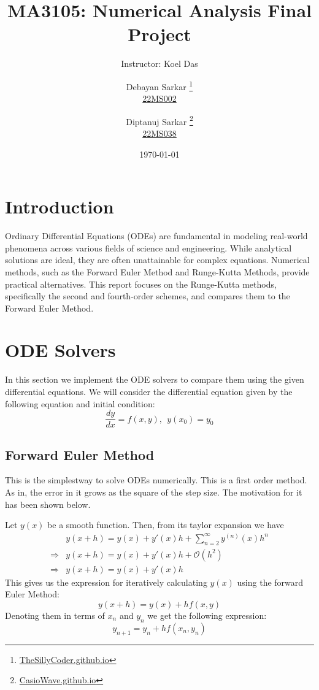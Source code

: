 \documentclass{scrartcl}
\begin{document}
    \title{MA3105: Numerical Analysis Final Project}
    \subtitle{Instructor: Koel Das}
    \author{
        Debayan Sarkar
            \thanks{{\href{https://thesillycoder.github.io}{TheSillyCoder.github.io}}}
            \\\href{mailto:ds22ms002@iiserkol.ac.in}{22MS002} \and
        Diptanuj Sarkar
        \thanks{{\href{https://casiowave.github.io}{CasioWave.github.io}}}
        \\\href{mailto:ds22ms038@iiserkol.ac.in}{22MS038} \and
    }
    \date{\today}
    \maketitle
    \tableofcontents
    \section{Introduction}
        Ordinary Differential Equations (ODEs) are fundamental in modeling real-world phenomena across various fields of science and engineering. While analytical solutions are ideal, they are often unattainable for complex equations. Numerical methods, such as the Forward Euler Method and Runge-Kutta Methods, provide practical alternatives. This report focuses on the Runge-Kutta methods, specifically the second and fourth-order schemes, and compares them to the Forward Euler Method.
    \section{ODE Solvers}
In this section we implement the ODE solvers to compare them using the given differential equations. We will consider the differential equation given by the following equation and initial condition:
$$\boxed{\frac{dy}{dx} = f(x, y),~~y(x_0) = y_0}$$

\subsection{Forward Euler Method}
This is the simplestway to solve ODEs numerically. This is a first order method. As in, the error in it grows as the square of the step size. The motivation for it has been shown below.

Let $y(x)$ be a smooth function. Then, from its taylor expansion we have
\begin{align*}
    &y(x + h) = y(x) + y'(x)h + \sum_{n = 2}^{\infty}y^{(n)}(x)h^n \\
    \Rightarrow &y(x + h) = y(x) + y'(x)h + \mathcal{O}(h^2) \\
    \Rightarrow &y(x + h) = y(x) + y'(x)h \tag{Ignoring the second order terms}
\end{align*}
This gives us the expression for iteratively calculating $y(x)$ using the forward Euler Method:
$$y(x + h) = y(x) + hf(x, y)$$
Denoting them in terms of $x_n$ and $y_n$ we get the following expression:
$$\boxed{y_{n+1} = y_n + hf(x_n, y_n)}$$
\end{document}
